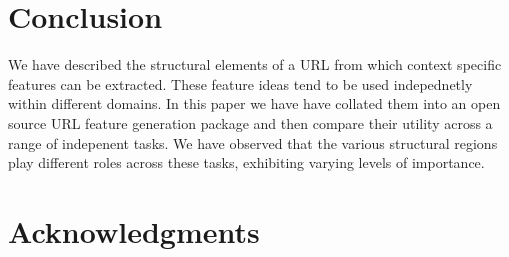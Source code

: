 \documentclass[sigconf]{acmart}
\begin{document}
\section{Conclusion}

We have described the structural elements of a URL from which context specific features can be extracted.
These feature ideas tend to be used indepednetly within different domains. In this paper we have have 
collated them into an open source URL feature generation package and then compare their utility across a range
of indepenent tasks. We have observed that the various structural regions play different roles across 
these tasks, exhibiting varying levels of importance.  



\section{Acknowledgments}



\end{document}
